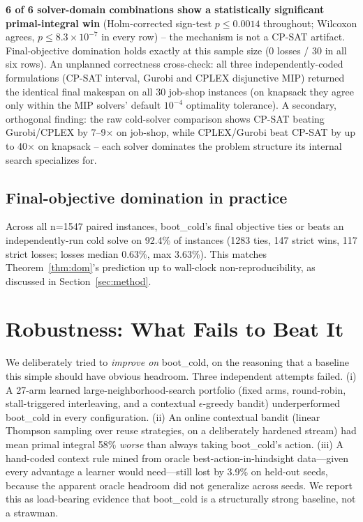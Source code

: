 \documentclass[11pt]{article}                        %
\begin{document}
\textbf{6 of 6 solver-domain combinations show a statistically significant
primal-integral win} (Holm-corrected sign-test $p \le 0.0014$ throughout;
Wilcoxon agrees, $p \le 8.3\times10^{-7}$ in every row) -- the mechanism is
not a CP-SAT artifact. Final-objective domination holds exactly at this
sample size (0 losses / 30 in all six rows). An unplanned correctness
cross-check: all three independently-coded formulations (CP-SAT interval,
Gurobi and CPLEX disjunctive MIP) returned the identical final makespan on
all 30 job-shop instances (on knapsack they agree only within the MIP
solvers' default $10^{-4}$ optimality tolerance). A secondary, orthogonal finding:
the raw cold-solver comparison shows CP-SAT beating Gurobi/CPLEX by
7--9$\times$ on job-shop, while CPLEX/Gurobi beat CP-SAT by up to
40$\times$ on knapsack -- each solver dominates the problem structure its
internal search specializes for.

\subsection{Final-objective domination in practice}
Across all n{=}1547 paired instances, boot\_cold's final objective ties or beats
an independently-run cold solve on 92.4\% of instances (1283 ties, 147 strict
wins, 117 strict losses; losses median 0.63\%, max 3.63\%). This matches
Theorem~\ref{thm:dom}'s prediction up to wall-clock non-reproducibility, as
discussed in Section~\ref{sec:method}.

\section{Robustness: What Fails to Beat It}
\label{sec:robustness}

We deliberately tried to \emph{improve on} boot\_cold, on the reasoning that a
baseline this simple should have obvious headroom. Three independent attempts
failed. (i) A 27-arm learned large-neighborhood-search portfolio (fixed arms,
round-robin, stall-triggered interleaving, and a contextual $\epsilon$-greedy
bandit) underperformed boot\_cold in every configuration. (ii) An online
contextual bandit (linear Thompson sampling over reuse strategies, on a
deliberately hardened stream) had mean primal integral 58\% \emph{worse} than
always taking boot\_cold's action. (iii) A hand-coded context rule mined from
oracle best-action-in-hindsight data---given every advantage a learner would
need---still lost by 3.9\% on held-out seeds, because the apparent oracle
headroom did not generalize across seeds. We report this as load-bearing
evidence that boot\_cold is a structurally strong baseline, not a strawman.
\end{document}
